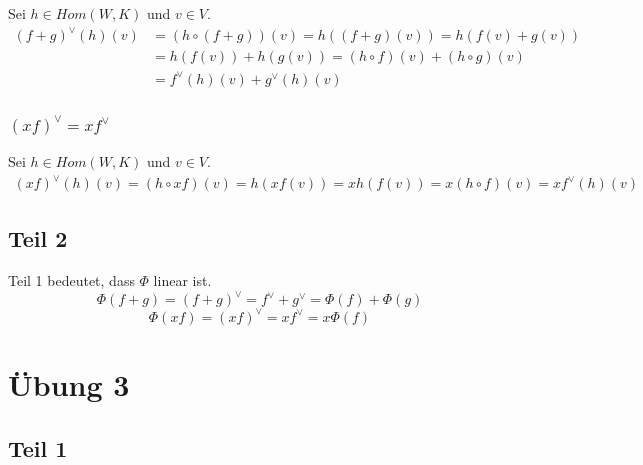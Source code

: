 \documentclass[a4paper,10pt]{article}
\begin{document}
Sei $h \in Hom(W, K)$ und $v \in V$.
\begin{align}
 (f + g)^\vee(h)(v) & = (h \circ (f + g))(v) = h((f + g)(v)) = h(f(v) + g(v))\\
 & = h(f(v)) + h(g(v)) = (h \circ f)(v) + (h \circ g)(v)\\
 & = f^\vee(h)(v) + g^\vee(h)(v)
\end{align}

\subsubsection*{$(xf)^\vee = xf^\vee$}

Sei $h \in Hom(W, K)$ und $v \in V$.
\begin{align}
 (xf)^\vee(h)(v) = (h \circ xf)(v) = h(xf(v)) = xh(f(v)) = x(h \circ f)(v) = xf^\vee(h)(v)
\end{align}

\subsection*{Teil 2}

Teil 1 bedeutet, dass $\Phi$ linear ist.
\begin{equation}
 \Phi(f + g) = (f + g)^\vee = f^\vee + g^\vee = \Phi(f) + \Phi(g)
\end{equation}
\begin{equation}
 \Phi(xf) = (xf)^\vee = xf^\vee = x\Phi(f)
\end{equation}

\section*{Übung 3}

\subsection*{Teil 1}
\end{document}
